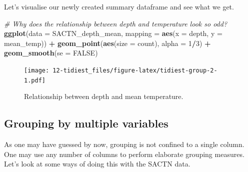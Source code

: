 \documentclass[]{book}
\newenvironment{Shaded}{\begin{snugshade}}{\end{snugshade}}
\newcommand{\KeywordTok}[1]{\textcolor[rgb]{0.13,0.29,0.53}{\textbf{#1}}}
\newcommand{\DataTypeTok}[1]{\textcolor[rgb]{0.13,0.29,0.53}{#1}}
\newcommand{\DecValTok}[1]{\textcolor[rgb]{0.00,0.00,0.81}{#1}}
\newcommand{\StringTok}[1]{\textcolor[rgb]{0.31,0.60,0.02}{#1}}
\newcommand{\CommentTok}[1]{\textcolor[rgb]{0.56,0.35,0.01}{\textit{#1}}}
\newcommand{\OtherTok}[1]{\textcolor[rgb]{0.56,0.35,0.01}{#1}}
\newcommand{\OperatorTok}[1]{\textcolor[rgb]{0.81,0.36,0.00}{\textbf{#1}}}
\newcommand{\NormalTok}[1]{#1}
\theoremstyle{definition}
\theoremstyle{definition}
\theoremstyle{definition}
\theoremstyle{remark}
\begin{document}
Let's visualise our newly created summary dataframe and see what we get.

\begin{Shaded}
\begin{Highlighting}[]
\CommentTok{# Why does the relationship between depth and temperature look so odd?}
\KeywordTok{ggplot}\NormalTok{(}\DataTypeTok{data =}\NormalTok{ SACTN_depth_mean, }\DataTypeTok{mapping =} \KeywordTok{aes}\NormalTok{(}\DataTypeTok{x =}\NormalTok{ depth, }\DataTypeTok{y =}\NormalTok{ mean_temp)) }\OperatorTok{+}
\StringTok{  }\KeywordTok{geom_point}\NormalTok{(}\KeywordTok{aes}\NormalTok{(}\DataTypeTok{size =}\NormalTok{ count), }\DataTypeTok{alpha =} \DecValTok{1}\OperatorTok{/}\DecValTok{3}\NormalTok{) }\OperatorTok{+}
\StringTok{  }\KeywordTok{geom_smooth}\NormalTok{(}\DataTypeTok{se =} \OtherTok{FALSE}\NormalTok{)}
\end{Highlighting}
\end{Shaded}

\begin{figure}
\centering
\texttt{[image: 12-tidiest\_files/figure-latex/tidiest-group-2-1.pdf]}
\caption{\label{fig:tidiest-group-2}Relationship between depth and mean
temperature.}
\end{figure}

\subsection{Grouping by multiple
variables}\label{grouping-by-multiple-variables}

As one may have guessed by now, grouping is not confined to a single
column. One may use any number of columns to perform elaborate grouping
measures. Let's look at some ways of doing this with the SACTN data.

\begin{Shaded}
\end{Shaded}
\end{document}
